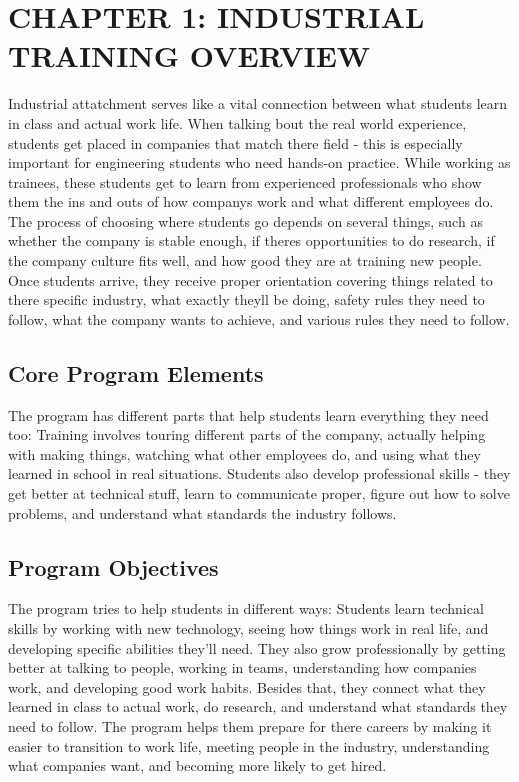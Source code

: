 \section{CHAPTER 1: INDUSTRIAL TRAINING OVERVIEW}
Industrial attatchment serves like a vital connection between what students learn in class and actual work life. When talking bout the real world experience, students get placed in companies that match there field - this is especially important for engineering students who need hands-on practice. While working as trainees, these students get to learn from experienced professionals who show them the ins and outs of how companys work and what different employees do.
The process of choosing where students go depends on several things, such as whether the company is stable enough, if theres opportunities to do research, if the company culture fits well, and how good they are at training new people. Once students arrive, they receive proper orientation covering things related to there specific industry, what exactly theyll be doing, safety rules they need to follow, what the company wants to achieve, and various rules they need to follow.
\subsection{Core Program Elements}
The program has different parts that help students learn everything they need too:
Training involves touring different parts of the company, actually helping with making things, watching what other employees do, and using what they learned in school in real situations. Students also develop professional skills - they get better at technical stuff, learn to communicate proper, figure out how to solve problems, and understand what standards the industry follows.
\subsection{Program Objectives}
The program tries to help students in different ways:
Students learn technical skills by working with new technology, seeing how things work in real life, and developing specific abilities they'll need. They also grow professionally by getting better at talking to people, working in teams, understanding how companies work, and developing good work habits. Besides that, they connect what they learned in class to actual work, do research, and understand what standards they need to follow. The program helps them prepare for there careers by making it easier to transition to work life, meeting people in the industry, understanding what companies want, and becoming more likely to get hired.
